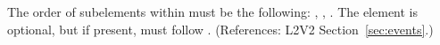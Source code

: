 The order of subelements within \Event must be the following:
, , .  The
 element is optional, but if present, must follow
.  (References: L2V2 Section~\ref{sec:events}.)
